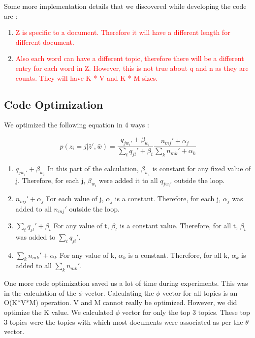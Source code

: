 \documentclass[11pt,a4paper,oneside]{article}
\def\red{\textcolor{red}}
\begin{document}
Some more implementation details that we discovered while developing the code are :

\begin{enumerate}
  \item \red{Z is specific to a document. Therefore it will have a different length for different document.}
  \item \red{Also each word can have a different topic, therefore there will be a different entry for each word in Z. However, this is not true about q and n as they are counts. They will have K * V and K * M sizes.}
\end{enumerate}

\subsection{Code Optimization}
We optimized the following equation in 4 ways :

\begin{equation}
p(z_i = j | \bar{z}', \bar{w}) = \frac{q_{j w_{i}'} + \beta_{w_i}}{\sum_t{q_{jt}' + \beta_t}}\frac{n_{mj}' + \alpha_j}{\sum_k{n_{mk}' + \alpha_k}}
\end{equation}

\begin{enumerate}
\item $q_{j w_{i}'}+\beta_{w_i}$ In this part of the calculation, $\beta_{w_i}$ is constant for any fixed value of j. Therefore, for each j, $\beta_{w_i}$ were added it to all $q_{j w_{i}'}$ outside the loop. 
\item $n_{mj}' + \alpha_j$ For each value of j, $\alpha_j$ is a constant. Therefore, for each j, $\alpha_j$ was added to all $n_{mj}'$ outside the loop.
\item $\sum_t{q_{jt}' + \beta_t}$ For any value of t, $\beta_t$ is a constant value. Therefore, for all t, $\beta_t$ was added to $\sum_t{q_{jt}}'$.
\item $\sum_k{n_{mk}' + \alpha_k}$ For any value of k, $\alpha_k$ is a constant. Therefore, for all k, $\alpha_k$ is added to all $\sum_k{n_{mk}}'$.
\end{enumerate}

\bigskip
One more code optimization saved us a lot of time during experiments. This was in the calculation of the $\phi$ vector. Calculating the $\phi$ vector for all topics is an O(K*V*M) operation. V and M cannot really be optimized. However, we did optimize the K value. We calculated $\phi$ vector for only the top 3 topics. These top 3 topics were the topics with which most documents were associated as per the $\theta$ vector.
\end{document}
